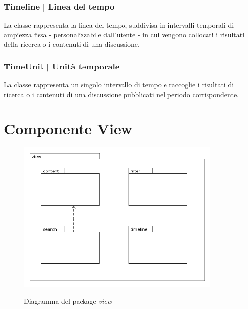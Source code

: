 \documentclass[10pt,a4paper,headinclude,footinclude,hidelinks]{scrreprt} %
\begin{document}
	\subsection[Timeline]{Timeline | Linea del tempo}
	\label{sec:stage:design:sistema:model.timeline:timeline}
	La classe \textit{} rappresenta la linea del tempo, suddivisa in intervalli temporali \textit{} di ampiezza fissa - personalizzabile dall'utente - in cui vengono collocati i risultati della ricerca o i contenuti di una discussione.

	\subsection[TimeUnit]{TimeUnit | Unità temporale}
	\label{sec:stage:design:sistema:model.timeline:time-unit}
	La classe \textit{} rappresenta un singolo intervallo di tempo e raccoglie i risultati di ricerca o i contenuti di una discussione pubblicati nel periodo corrispondente.

	\chapter{Componente View}
	\label{ch:stage:design:view}

	\begin{figure}[ht]
		\begin{center}
	    	\includegraphics[width=10cm]{package/view.png}
			\label{gfx:package:view}
			\caption{Diagramma del package \textit{view}}
		\end{center}
	\end{figure}
\end{document}
